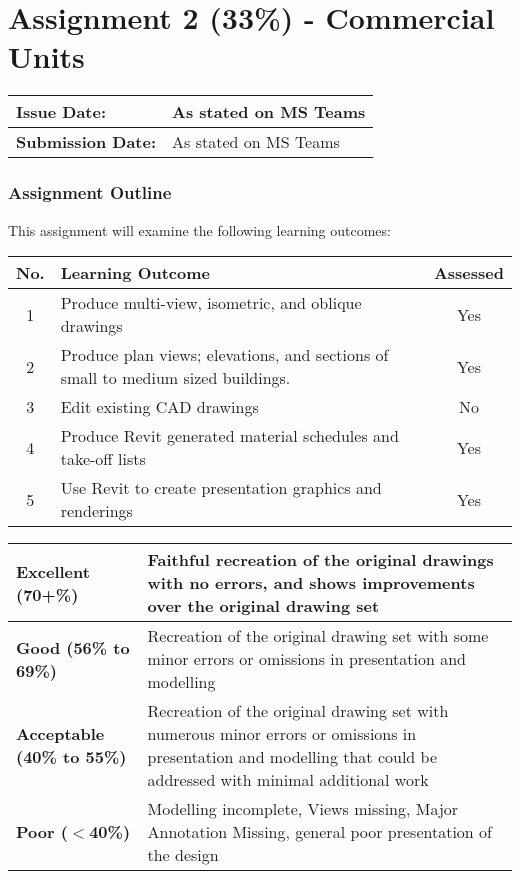 
	
\part*{Assignment 2 (33\%) - Commercial Units}

\begin{tabularx}{\textwidth}{ |X|X| }
	\hline
	\textbf{Issue Date:} & As stated on MS Teams\\
	\hline 
	\textbf{Submission Date:}  & As stated on MS Teams  \\
	\hline
\end{tabularx}

\section*{Assignment Outline}

This assignment will examine the following learning outcomes:

\begin{tabularx}{\textwidth}{ |c|X|c| }
	\hline
	\textbf{No.} & \textbf{Learning Outcome} & \textbf{Assessed} \\
	\hline 
	1  & Produce multi-view, isometric, and oblique drawings & Yes \\
	2  & Produce plan views; elevations, and sections of small to medium sized buildings. & Yes \\
	3  & Edit existing CAD drawings & No \\
	4  & Produce Revit generated material schedules and take-off lists & Yes \\
	5  & Use Revit to create presentation graphics and renderings & Yes \\
	\hline
\end{tabularx}

\vspace{1cm}

\begin{tabularx}{\textwidth}{ |l|X| }
	\hline 
	\textbf{Excellent (70+\%)} & Faithful recreation of the original drawings with no errors, and shows improvements over the original drawing set\\ 
	\hline
	\textbf{Good (56\% to 69\%)} & Recreation of the original drawing set with some minor errors or omissions in presentation and modelling \\
	\hline
	\textbf{Acceptable (40\% to 55\%)} & Recreation of the original drawing set with numerous minor errors or omissions in presentation and modelling that could be addressed with minimal additional work \\ 
	\hline
	\textbf{Poor ($<$40\%)} & Modelling incomplete, Views missing, Major Annotation Missing, general poor presentation of the design  \\
	\hline
\end{tabularx}

